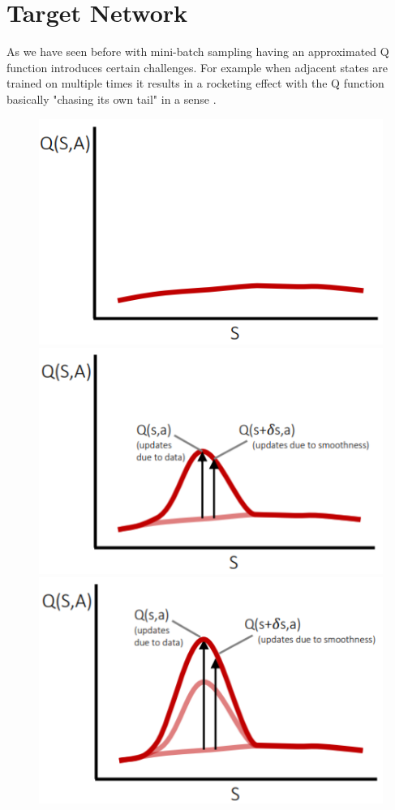 \section{Target Network }

As we have seen before with mini-batch sampling having an approximated Q function introduces certain challenges. 
For example when adjacent states are trained on multiple times
it results in a rocketing effect with the Q function basically "chasing its own tail" in a sense \cite{lecture_dqn}.  
\begin{figure}[h!h!h!h]
\centering
\includegraphics[scale=0.5]{figures/target 1.PNG}
\includegraphics[scale=0.5]{figures/target 2.PNG}\\
\includegraphics[scale=0.5]{figures/target 3.PNG}

\end{figure}
